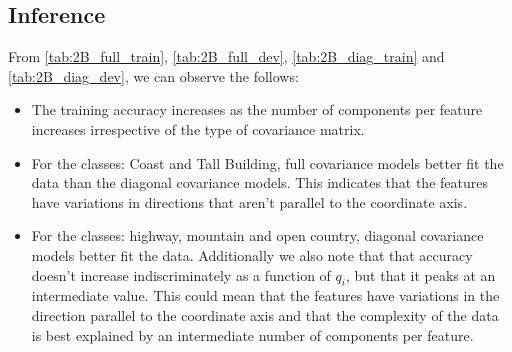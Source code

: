 \documentclass[11pt,a4paper]{article}
\begin{document}
\subsection{Inference}
From \autoref{tab:2B_full_train}, \autoref{tab:2B_full_dev}, \autoref{tab:2B_diag_train} and \autoref{tab:2B_diag_dev}, we can observe the follows:
\begin{itemize}
    \itemsep0em
    \item The training accuracy increases as the number of components per feature increases irrespective of the type of covariance matrix.
    \item For the classes: Coast and Tall Building, full covariance models better fit the data than the diagonal covariance models. This indicates that the features have variations in directions that aren't parallel to the coordinate axis. 
    \item For the classes: highway, mountain and open country, diagonal covariance models better fit the data. Additionally we also note that that accuracy doesn't increase indiscriminately as a function of $q_i$, but that it peaks at an intermediate value. This could mean that the features have variations in the direction parallel to the coordinate axis and that the complexity of the data is best explained by an intermediate number of components per feature.
\end{itemize}
\end{document}
